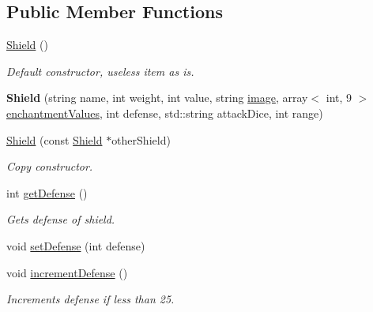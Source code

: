 \subsection*{Public Member Functions}
\begin{DoxyCompactItemize}
\item 
\hypertarget{class_shield_a8a6e827c94750d8c1a1d523cb1b105de}{}\label{class_shield_a8a6e827c94750d8c1a1d523cb1b105de} 
\hyperlink{class_shield_a8a6e827c94750d8c1a1d523cb1b105de}{Shield} ()
\begin{DoxyCompactList}\small\item\em Default constructor, useless item as is. \end{DoxyCompactList}\item 
\hypertarget{class_shield_ae3dbea08547d4547faa441e5169605ba}{}\label{class_shield_ae3dbea08547d4547faa441e5169605ba} 
{\bfseries Shield} (string name, int weight, int value, string \hyperlink{class_item_add84a42b692ee5d580a92ae4a922f784}{image}, array$<$ int, 9 $>$ \hyperlink{class_item_a8532d8729f9433f41b7fc18b20d83236}{enchantment\+Values}, int defense, std\+::string attack\+Dice, int range)
\item 
\hypertarget{class_shield_a8c77767b623247b3ce1d42cbe3d3da05}{}\label{class_shield_a8c77767b623247b3ce1d42cbe3d3da05} 
\hyperlink{class_shield_a8c77767b623247b3ce1d42cbe3d3da05}{Shield} (const \hyperlink{class_shield}{Shield} $\ast$other\+Shield)
\begin{DoxyCompactList}\small\item\em Copy constructor. \end{DoxyCompactList}\item 
\hypertarget{class_shield_a92fae272ca41b96a9f38770de4ed6180}{}\label{class_shield_a92fae272ca41b96a9f38770de4ed6180} 
int \hyperlink{class_shield_a92fae272ca41b96a9f38770de4ed6180}{get\+Defense} ()
\begin{DoxyCompactList}\small\item\em Gets defense of shield. \end{DoxyCompactList}\item 
void \hyperlink{class_shield_a3e421a1c80aae934300dadf6db390bf1}{set\+Defense} (int defense)
\item 
\hypertarget{class_shield_a4031510f895e4163ee2b447d7992e08b}{}\label{class_shield_a4031510f895e4163ee2b447d7992e08b} 
void \hyperlink{class_shield_a4031510f895e4163ee2b447d7992e08b}{increment\+Defense} ()
\begin{DoxyCompactList}\small\item\em Increments defense if less than 25. \end{DoxyCompactList}\item 

\end{DoxyCompactItemize}
